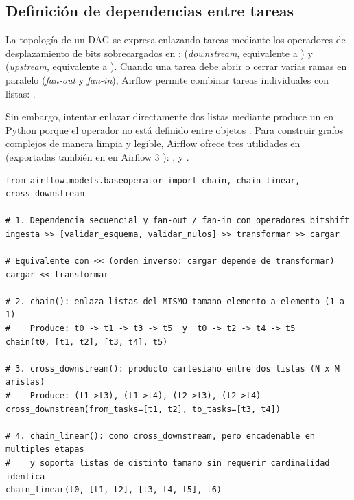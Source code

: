 \subsection{Definición de dependencias entre tareas}

La topología de un DAG se expresa enlazando tareas mediante los operadores de desplazamiento de bits sobrecargados en : \code{>>} (\textit{downstream}, equivalente a ) y \code{<<} (\textit{upstream}, equivalente a ). Cuando una tarea debe abrir o cerrar varias ramas en paralelo (\textit{fan-out} y \textit{fan-in}), Airflow permite combinar tareas individuales con listas: .

Sin embargo, intentar enlazar directamente dos listas mediante \code{[t1, t2] >> [t3, t4]} produce un  en Python porque el operador \code{>>} no está definido entre objetos . Para construir grafos complejos de manera limpia y legible, Airflow ofrece tres utilidades en  (exportadas también en  en Airflow 3 ): ,  y .

\begin{lstlisting}[style=python, caption={Patrones de declaración de dependencias: bitshift, \code{chain}, \code{chain\_linear} y \code{cross\_downstream}.}, label={lst:dependencias-helpers}]
from airflow.models.baseoperator import chain, chain_linear, cross_downstream

# 1. Dependencia secuencial y fan-out / fan-in con operadores bitshift
ingesta >> [validar_esquema, validar_nulos] >> transformar >> cargar

# Equivalente con << (orden inverso: cargar depende de transformar)
cargar << transformar

# 2. chain(): enlaza listas del MISMO tamano elemento a elemento (1 a 1)
#    Produce: t0 -> t1 -> t3 -> t5  y  t0 -> t2 -> t4 -> t5
chain(t0, [t1, t2], [t3, t4], t5)

# 3. cross_downstream(): producto cartesiano entre dos listas (N x M aristas)
#    Produce: (t1->t3), (t1->t4), (t2->t3), (t2->t4)
cross_downstream(from_tasks=[t1, t2], to_tasks=[t3, t4])

# 4. chain_linear(): como cross_downstream, pero encadenable en multiples etapas
#    y soporta listas de distinto tamano sin requerir cardinalidad identica
chain_linear(t0, [t1, t2], [t3, t4, t5], t6)
\end{lstlisting}

